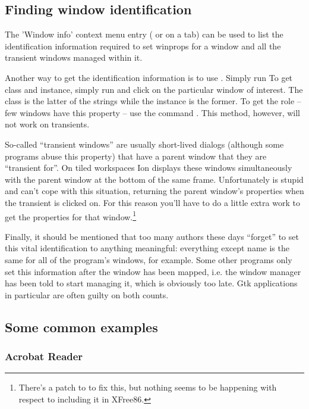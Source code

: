 \subsection{Finding window identification}

The 'Window info' context menu entry ( or  on a tab)
can be used to list the identification information required to set winprops
for a window and all the transient windows managed within it. 

Another way to get the identification information is to use .
Simply run To get class and instance, simply run 
and click on the particular window of interest. The class is the latter of
the strings while the instance is the former.  To get the role -- few
windows have this property -- use the command . 
This method, however, will not work on transients. 

So-called ``transient windows'' are usually short-lived dialogs (although
some programs abuse this property) that have a parent window that they are
``transient for''. On tiled workspaces Ion displays these windows 
simultaneously with the parent window at the bottom of the same frame.
Unfortunately  is stupid and can't cope with this situation,
returning the parent window's properties when the transient is clicked on.
For this reason you'll have to do a little extra work to get the properties
for that window.\footnote{There's a patch to  to
fix this, but nothing seems to be happening with respect to including it in 
XFree86.}

Finally, it should be mentioned that too many authors these days
``forget'' to set this vital identification to anything meaningful:
everything except name is the same for all of the program's 
windows, for example. Some other programs only set this information
after the window has been mapped, i.e. the window manager has been
told to start managing it, which is obviously too late. 
Gtk applications in particular are often guilty on both counts.


\subsection{Some common examples}

\subsubsection{Acrobat Reader}

